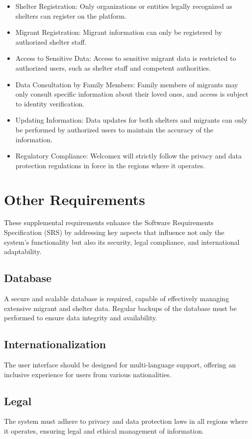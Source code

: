 \documentclass{scrreprt}
\begin{document}
\begin{itemize}
    \item Shelter Registration: Only organizations or entities legally recognized as shelters can register on the platform.
    \item Migrant Registration: Migrant information can only be registered by authorized shelter staff.
    \item Access to Sensitive Data: Access to sensitive migrant data is restricted to authorized users, such as shelter staff and competent authorities.
    \item Data Consultation by Family Members: Family members of migrants may only consult specific information about their loved ones, and access is subject to identity verification.
    \item Updating Information: Data updates for both shelters and migrants can only be performed by authorized users to maintain the accuracy of the information.
    \item Regulatory Compliance: Welcomex will strictly follow the privacy and data protection regulations in force in the regions where it operates.
\end{itemize}

\chapter{Other Requirements}
These supplemental requirements enhance the Software Requirements Specification (SRS) by addressing key aspects that influence not only the system's functionality but also its security, legal compliance, and international adaptability.

\section*{Database}
A secure and scalable database is required, capable of effectively managing extensive migrant and shelter data. Regular backups of the database must be performed to ensure data integrity and availability.

\section*{Internationalization}
The user interface should be designed for multi-language support, offering an inclusive experience for users from various nationalities.

\section*{Legal}
The system must adhere to privacy and data protection laws in all regions where it operates, ensuring legal and ethical management of information.
\end{document}
